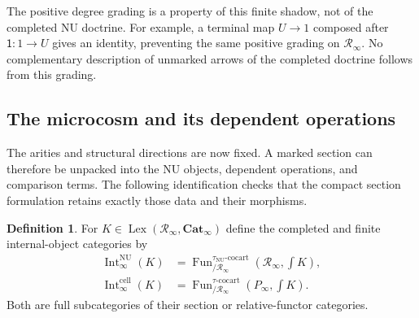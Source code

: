 \documentclass[oneside]{article}
\theoremstyle{plain}
\theoremstyle{definition}
\newtheorem{definition}[theorem]{Definition}
\theoremstyle{remark}
\newcommand{\Cat}{\mathbf{Cat}_{\infty}}
\newcommand{\Fun}{\operatorname{Fun}}
\newcommand{\Int}{\operatorname{Int}}
\newcommand{\Lex}{\operatorname{Lex}}
\newcommand{\NU}{\mathrm{NU}}
\newcommand{\RNU}{\mathcal R_{\infty}}
\newcommand{\coc}{\mathrm{cocart}}
\begin{document}
The positive degree grading is a property of this finite shadow, not
of the completed NU doctrine. For example, a terminal map $U\to1$
composed after $\mathsf1:1\to U$ gives an identity, preventing the
same positive grading on $\RNU$. No complementary description of
unmarked arrows of the completed doctrine follows from this grading.



\subsection{The microcosm and its dependent operations}

The arities and structural directions are now fixed. A marked section can
therefore be unpacked into the NU objects, dependent operations, and
comparison terms. The following identification checks that the compact
section formulation retains exactly those data and their morphisms.

\begin{definition}
For $K\in\Lex(\RNU,\Cat)$ define the completed and finite internal-object
categories by
\begin{align}
 \Int^{\NU}_\infty(K)
 &=\Fun^{\tau_{\NU}\text{-}\coc}_{/\RNU}
       (\RNU,\textstyle\int K),\label{eq:nu-internal}\\
 \Int^{\mathrm{cell}}_\infty(K)
 &=\Fun^{\tau\text{-}\coc}_{/\RNU}
       (P_\infty,\textstyle\int K).\label{eq:cell-internal}
\end{align}
Both are full subcategories of their section or relative-functor categories.
\end{definition}
\end{document}
